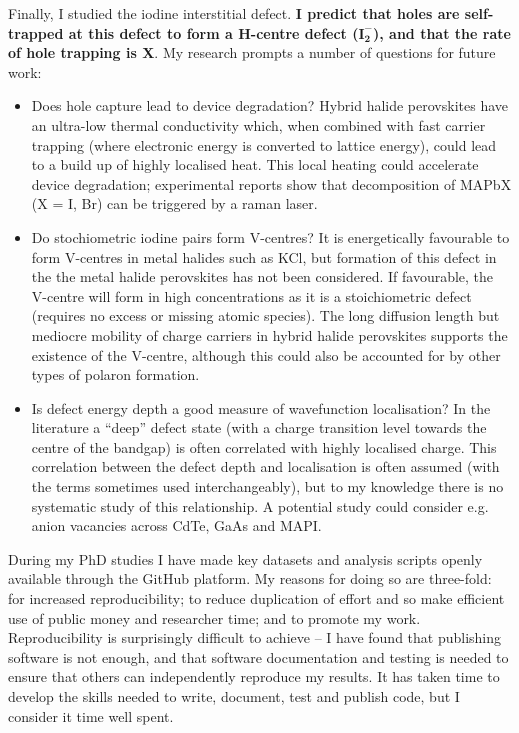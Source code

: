 Finally, I studied the iodine interstitial defect. \textbf{I predict that holes are self-trapped at this defect to form a H-centre defect ($\mathbf{I_2^-}$), and that the rate of hole trapping is X}. My research prompts a number of questions for future work:
\begin{itemize}
    \item Does hole capture lead to device degradation? Hybrid halide perovskites have an ultra-low thermal conductivity\autocite{Whalley2016} which, when combined with fast carrier trapping (where electronic energy is converted to lattice energy), could lead to a build up of highly localised heat. This local heating could accelerate device degradation; experimental reports show that decomposition of MAPbX (X = I, Br) can be triggered by a raman laser.\autocite{Ledinski2015}
    \item Do stochiometric iodine pairs form V-centres? It is energetically favourable to form V-centres in metal halides such as KCl,\autocite{Castner1957} but formation of this defect in the the metal halide perovskites has not been considered. If favourable, the V-centre will form in high concentrations as it is a stoichiometric defect (requires no excess or missing atomic species). The long diffusion length but mediocre mobility of charge carriers in hybrid halide perovskites\autocite{Brenner2015} supports the existence of the V-centre, although this could also be accounted for by other types of polaron formation. 
    \item Is defect energy depth a good measure of wavefunction localisation? In the literature a ``deep'' defect state (with a charge transition level towards the centre of the bandgap) is often correlated with highly localised charge. This correlation between the defect depth and localisation is often assumed (with the terms sometimes used interchangeably), but to my knowledge there is no systematic study of this relationship. A potential study could consider e.g. anion vacancies across CdTe, GaAs and MAPI.
\end{itemize}

During my PhD studies I have made key datasets and analysis scripts openly available through the GitHub platform. My reasons for doing so are three-fold: for increased reproducibility; to reduce duplication of effort and so make efficient use of public money and researcher time; and to promote my work. Reproducibility is surprisingly difficult to achieve -- I have found that publishing software is not enough, and that software documentation and testing is needed to ensure that others can independently reproduce my results. It has taken time to develop the skills needed to write, document, test and publish code, but I consider it time well spent.

